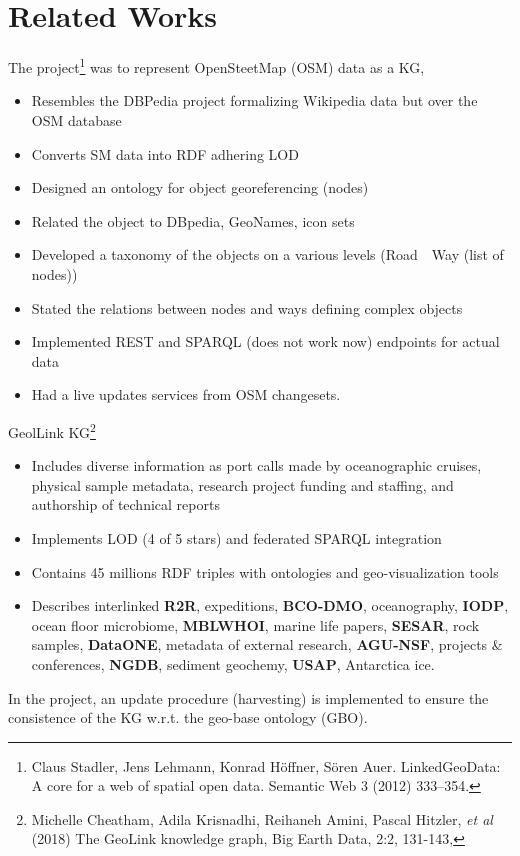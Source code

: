 \documentclass[
]{ceurart}
\begin{document}
\section{Related Works}

  The project\footnote{Claus Stadler, Jens Lehmann, Konrad Höffner, Sören Auer. LinkedGeoData:
A core for a web of spatial open data. Semantic Web 3 (2012) 333–354. } was to represent OpenSteetMap (OSM) data as a KG,
  \begin{itemize}
  \item Resembles the DBPedia project formalizing Wikipedia data but over the OSM database
  \item Converts SM data into RDF adhering LOD
  \item Designed an ontology for object georeferencing (nodes)
  \item Related the object to DBpedia, GeoNames, icon sets
  \item Developed a taxonomy of the objects on a various levels (Road~\to~Way (list of nodes)) %
  \item Stated the relations between nodes and ways defining complex objects
  \item Implemented REST and SPARQL (does not work now) endpoints for actual data
  \item Had a live updates services from OSM changesets.
  \end{itemize}


    GeolLink KG\footnote{Michelle Cheatham, Adila Krisnadhi, Reihaneh Amini, Pascal Hitzler, \emph{et al} (2018) The GeoLink knowledge graph, Big Earth Data, 2:2, 131-143, }
  \begin{itemize}
  \item Includes diverse information as port calls made by oceanographic cruises, physical sample metadata, research project funding and staffing, and authorship of technical reports
  \item Implements LOD (4 of 5 stars) and federated SPARQL integration
  \item Contains 45 millions RDF triples with ontologies and geo-visualization tools
  \item Describes interlinked \textbf{R2R}, expeditions, \textbf{BCO-DMO}, oceanography, \textbf{IODP}, ocean floor microbiome, \textbf{MBLWHOI}, marine life papers, \textbf{SESAR}, rock samples, \textbf{DataONE}, metadata of external research,  \textbf{AGU-NSF}, projects \& conferences, \textbf{NGDB}, sediment geochemy, \textbf{USAP}, Antarctica ice.
  \end{itemize}
  In the project, an update procedure (harvesting) is implemented to ensure the consistence of the KG w.r.t. the geo-base ontology (GBO).
\end{document}
